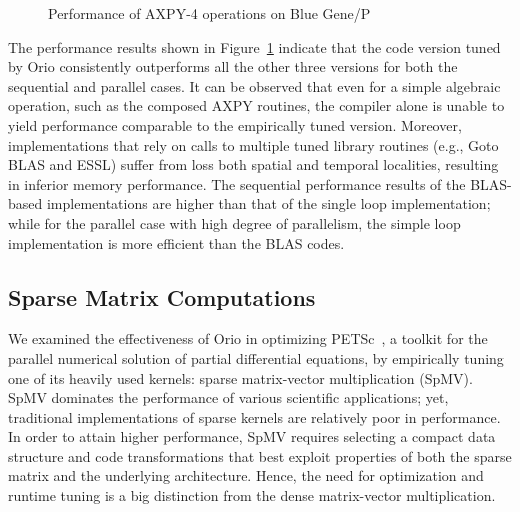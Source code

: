 \begin{figure}[thb] 
\begin{center} 
\end{center}
\vspace{-.2in} 
\caption{Performance of AXPY-4 operations on Blue Gene/P} 
\label{fig:axpy4-bgp-results} 
\end{figure} 

The performance results shown in Figure~\ref{fig:axpy4-bgp-results}
indicate that the code version tuned by Orio consistently outperforms
all the other three versions for both the sequential and parallel
cases. It can be observed that even for a simple algebraic operation,
such as the composed AXPY routines, the compiler alone is unable to
yield performance comparable to the empirically tuned
version. Moreover, implementations that rely on calls to multiple
tuned library routines (e.g., Goto BLAS and ESSL) suffer from loss
both spatial and temporal localities, resulting in inferior memory
performance. The sequential performance results of the BLAS-based
implementations are higher than that of the single loop
implementation; while for the parallel case with high degree of
parallelism, the simple loop implementation is more efficient than the
BLAS codes.


\subsection{Sparse Matrix Computations} 

We examined the effectiveness of Orio in optimizing
PETSc~\cite{petsc-efficient}, a toolkit for the parallel numerical
solution of partial differential equations, by empirically tuning one
of its heavily used kernels: sparse matrix-vector multiplication
(SpMV). SpMV dominates the performance of various scientific
applications; yet, traditional implementations of sparse kernels are
relatively poor in performance. In order to attain higher performance,
SpMV requires selecting a compact data structure and code
transformations that best exploit properties of both the sparse matrix
and the underlying architecture. Hence, the need for optimization and
runtime tuning is a big distinction from the dense matrix-vector
multiplication.

